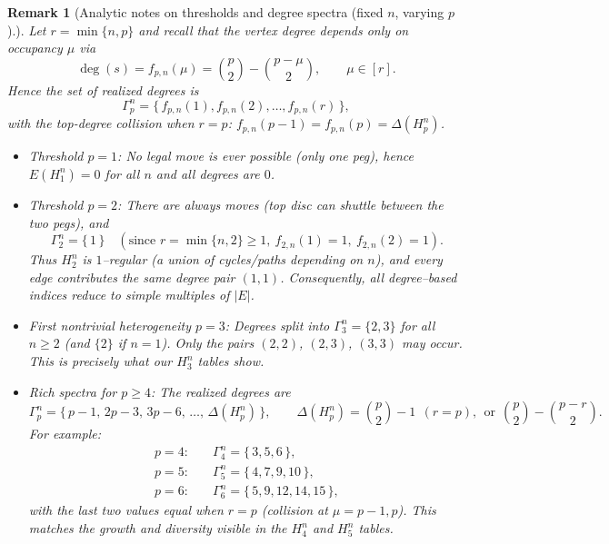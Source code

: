 \documentclass[letterpaper,12pt]{article}
\newtheorem{remark}{Remark}
\begin{document}
\begin{remark}[Analytic notes on thresholds and degree spectra (fixed $n$, varying $p$).]
    Let $r=\min\{n,p\}$ and recall that the vertex degree depends only on occupancy $\mu$ via
\[
\deg(s)=f_{p,n}(\mu)=\binom{p}{2}-\binom{p-\mu}{2},\qquad \mu\in[r].
\]
Hence the set of realized degrees is
\[
\Gamma_p^n=\big\{\,f_{p,n}(1),f_{p,n}(2),\dots,f_{p,n}(r)\,\big\},
\]
with the \emph{top-degree collision} when $r=p$:
$f_{p,n}(p-1)=f_{p,n}(p)=\Delta(H_p^n)$.

\begin{itemize}
\item Threshold $p=1$: No legal move is ever possible (only one peg), hence $E(H_1^n)=0$ for all $n$ and all degrees are $0$.

\item Threshold $p=2$: There are always moves (top disc can shuttle between the two pegs), and
\[
\Gamma_2^n=\{\,1\,\}\quad(\text{since }r=\min\{n,2\}\ge 1,\ f_{2,n}(1)=1,\ f_{2,n}(2)=1).
\]
Thus $H_2^n$ is $1$–regular (a union of cycles/paths depending on $n$), and every edge contributes the same degree pair $(1,1)$.
Consequently, all degree–based indices reduce to simple multiples of $|E|$.

\item First nontrivial heterogeneity $p=3$: Degrees split into $\Gamma_3^n=\{2,3\}$ for all $n\ge 2$ (and $\{2\}$ if $n=1$).
Only the pairs $(2,2)$, $(2,3)$, $(3,3)$ may occur. This is precisely what our $H_3^n$ tables show.

\item Rich spectra for $p\ge 4$: The realized degrees are
\[
\Gamma_p^n=\{\,p-1,\,2p-3,\,3p-6,\,\dots,\,\Delta(H_p^n)\,\},\qquad
\Delta(H_p^n)=\binom{p}{2}-1 \ \ (r=p),\ \ \text{or}\ \ \binom{p}{2}-\binom{p-r}{2}.
\]
For example:
\begin{align*}
p=4:\quad & \Gamma_4^n=\{\,3,5,6\,\},\\
p=5:\quad & \Gamma_5^n=\{\,4,7,9,10\,\},\\
p=6:\quad & \Gamma_6^n=\{\,5,9,12,14,15\,\},
\end{align*}
with the last two values equal when $r=p$ (collision at $\mu=p-1,p$).
This matches the growth and diversity visible in the $H_4^n$ and $H_5^n$ tables.

 

 

 
\end{itemize}
\end{remark}
\end{document}
